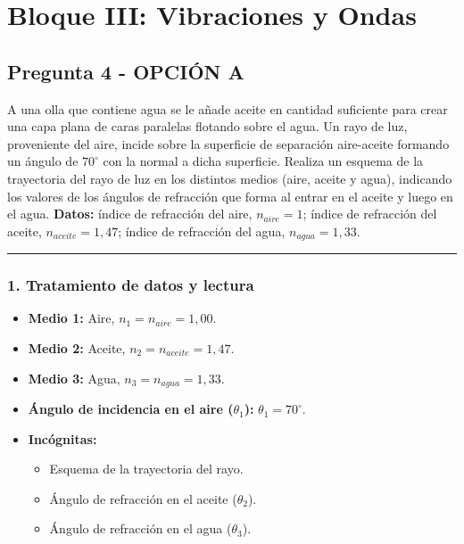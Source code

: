 \section{Bloque III: Vibraciones y Ondas}
\label{sec:ondas_2025_jul_ext}
\subsection{Pregunta 4 - OPCIÓN A}
\label{subsec:4A_2025_jul_ext}

\begin{cajaenunciado}
A una olla que contiene agua se le añade aceite en cantidad suficiente para crear una capa plana de caras paralelas flotando sobre el agua. Un rayo de luz, proveniente del aire, incide sobre la superficie de separación aire-aceite formando un ángulo de $70^{\circ}$ con la normal a dicha superficie. Realiza un esquema de la trayectoria del rayo de luz en los distintos medios (aire, aceite y agua), indicando los valores de los ángulos de refracción que forma al entrar en el aceite y luego en el agua.
\textbf{Datos:} índice de refracción del aire, $n_{aire}=1$; índice de refracción del aceite, $n_{aceite}=1,47$; índice de refracción del agua, $n_{agua}=1,33$.
\end{cajaenunciado}
\hrule

\subsubsection*{1. Tratamiento de datos y lectura}
\begin{itemize}
    \item \textbf{Medio 1:} Aire, $n_1 = n_{aire} = 1,00$.
    \item \textbf{Medio 2:} Aceite, $n_2 = n_{aceite} = 1,47$.
    \item \textbf{Medio 3:} Agua, $n_3 = n_{agua} = 1,33$.
    \item \textbf{Ángulo de incidencia en el aire ($\theta_1$):} $\theta_1 = 70^{\circ}$.
    \item \textbf{Incógnitas:}
    \begin{itemize}
        \item Esquema de la trayectoria del rayo.
        \item Ángulo de refracción en el aceite ($\theta_2$).
        \item Ángulo de refracción en el agua ($\theta_3$).
    \end{itemize}
\end{itemize}

